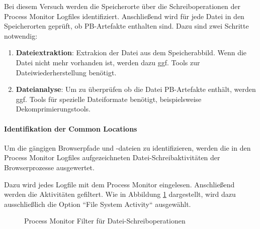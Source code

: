 Bei diesem Versuch werden die Speicherorte über die Schreiboperationen der Process Monitor Logfiles identifiziert.
Anschließend wird für jede Datei in den Speicherorten geprüft, ob PB-Artefakte enthalten sind.
Dazu sind zwei Schritte notwendig:
\begin{enumerate}
\item \textbf{Dateiextraktion}: Extrakion der Datei aus dem Speicherabbild. Wenn die Datei nicht mehr vorhanden ist, werden dazu ggf. Tools zur Dateiwiederherstellung benötigt.
\item \textbf{Dateianalyse}: Um zu überprüfen ob die Datei PB-Artefakte enthält, werden ggf. Tools für spezielle Dateiformate benötigt, beispielsweise Dekomprimierungstools.
\end{enumerate}

\paragraph*{Identifikation der Common Locations}
Um die gängigen Browserpfade und -dateien zu identifizieren, werden die in den Process Monitor Logfiles aufgezeichneten Datei-Schreibaktivitäten der Browserprozesse ausgewertet.

Dazu wird jedes Logfile mit dem Process Monitor eingelesen. Anschließend werden die Aktivitäten gefiltert. Wie in Abbildung \ref{img:procmon-writefile-filter} dargestellt, wird dazu ausschließlich die Option ``File System Activity`` ausgewählt.
\begin{figure}[h!]
	\centerline{}
	\caption{Process Monitor Filter für Datei-Schreiboperationen}
	\label{img:procmon-writefile-filter}
\end{figure}

